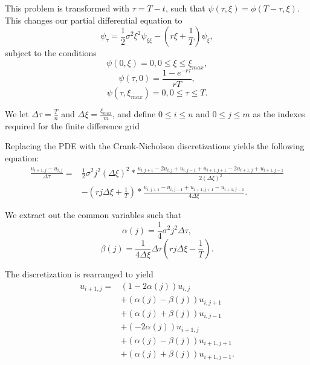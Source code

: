 \documentclass{article}
\begin{document}
This problem is transformed with \(\tau = T - t \), such that \(\psi(\tau, \xi) = \phi(T-\tau, \xi)\). This changes our partial differential equation to
\begin{equation}
  \psi_\tau = \frac{1}{2}\sigma^2\xi^2\psi_{\xi\xi} - (r\xi + \frac{1}{T})\psi_\xi,
\end{equation}
subject to the conditions
\begin{equation}
  \psi(0, \xi) = 0, 0 \le \xi \le \xi_{max},
\end{equation}
\begin{equation}
  \psi(\tau, 0) = \frac{1-e^{-r\tau}}{rT},
\end{equation}
\begin{equation}
  \psi(\tau, \xi_{max}) = 0, 0 \le \tau \le T.
\end{equation}

We let \(\Delta\tau = \frac{T}{n}\) and \(\Delta\xi = \frac{\xi_{max}}{m}\), and define \(0 \le i \le n\) and \(0 \le j \le m\) as the indexes required for the finite difference grid

Replacing the PDE with the Crank-Nicholson discretizations yields the following equation:
\begin{equation}
  \begin{split}
    \frac{u_{i+1, j} - u_{i, j}}{\Delta\tau} = & \frac{1}{2}\sigma^2j^2(\Delta\xi)^2 * \frac{u_{i, j+1} - 2u_{i, j} + u_{i, j-1} + u_{i + 1, j+1} - 2 u_{i+1, j} + u_{i+1, j-1}}{2(\Delta\xi)^2} \\ & - (rj\Delta\xi + \frac{1}{T}) * \frac{u_{i, j+1} - u_{i,j-1} +u_{i+1, j+1} - u_{i+1, j-1}}{4\Delta\xi}.
  \end{split}
\end{equation}

We extract out the common variables such that
\begin{equation}
  \alpha(j) = \frac{1}{4}\sigma^2j^2\Delta\tau,
\end{equation}
\begin{equation}
  \beta(j) = \frac{1}{4\Delta\xi}\Delta\tau(rj\Delta\xi - \frac{1}{T}).
\end{equation}

The discretization is rearranged to yield
\begin{equation}
  \begin{split}
    u_{i+1, j} = & (1-2\alpha(j))u_{i, j} \\
    & + (\alpha(j)-\beta(j))u_{i, j+1}\\
    & + (\alpha(j)+\beta(j))u_{i, j-1}\\
    & + (-2\alpha(j))u_{i+1, j}\\
    & + (\alpha(j)-\beta(j))u_{i+1, j+1}\\
    & + (\alpha(j)+\beta(j))u_{i+1, j-1}.
  \end{split}
\end{equation}
\end{document}
